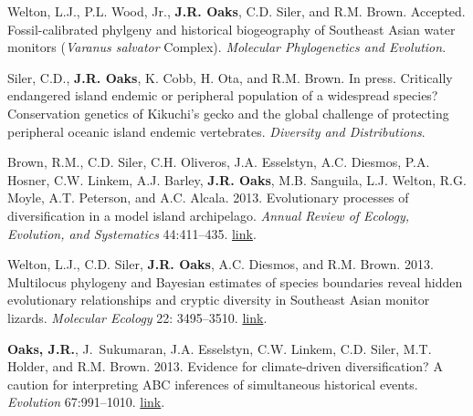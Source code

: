 \documentclass[10pt]{article}
\begin{document}
% 
\begin{thebibliography}{8}
\providecommand{\natexlab}[1]{#1}
\providecommand{\url}[1]{\texttt{#1}}
\providecommand{\urlprefix}{URL }

  Welton, L.J., P.L. Wood, Jr., {\bf J.R. Oaks}, C.D. Siler, and R.M. Brown.
  Accepted.
\newblock Fossil-calibrated phylgeny and historical biogeography of {S}outheast
  {A}sian water monitors (\emph{{V}aranus salvator} {C}omplex).
  \newblock \emph{Molecular Phylogenetics and Evolution}.

Siler, C.D., {\bf J.R. Oaks}, K. Cobb, H. Ota, and R.M. Brown. In press.
\newblock Critically endangered island endemic or peripheral population of a
widespread species? Conservation genetics of Kikuchi's gecko and the global
challenge of protecting peripheral oceanic island endemic vertebrates.
\newblock \emph{Diversity and Distributions}.

Brown, R.M., C.D. Siler, C.H. Oliveros, J.A. Esselstyn, A.C. Diesmos,
P.A. Hosner, C.W. Linkem, A.J. Barley, {\bf J.R. Oaks}, M.B. Sanguila, L.J.
  Welton, R.G. Moyle, A.T. Peterson, and A.C. Alcala. 2013.
\newblock Evolutionary processes of diversification in a model island
  archipelago.
\newblock \emph{Annual Review of Ecology, Evolution, and Systematics} 44:411--435.
\newblock
  \href{http://www.annualreviews.org/doi/abs/10.1146/annurev-ecolsys-110411-160323}{link}.

  Welton, L.J., C.D. Siler, {\bf J.R. Oaks}, A.C. Diesmos, and R.M. Brown.
  2013.
\newblock Multilocus phylogeny and {B}ayesian estimates of species boundaries
  reveal hidden evolutionary relationships and cryptic diversity in {S}outheast
  {A}sian monitor lizards.
\newblock \emph{Molecular Ecology} 22: 3495--3510.
\newblock
  \href{http://onlinelibrary.wiley.com/doi/10.1111/mec.12324/abstract}{link}.

{\bf Oaks, J.R.}, J.~Sukumaran, J.A. Esselstyn, C.W. Linkem, C.D. Siler, M.T.
  Holder, and R.M. Brown. 2013.
\newblock Evidence for climate-driven diversification? A caution for
  interpreting {ABC} inferences of simultaneous historical events.
\newblock \emph{Evolution} 67:991--1010.
\newblock
  \href{http://onlinelibrary.wiley.com/doi/10.1111/j.1558-5646.2012.01840.x/abstract}{link}.


\end{thebibliography}
\end{document}
